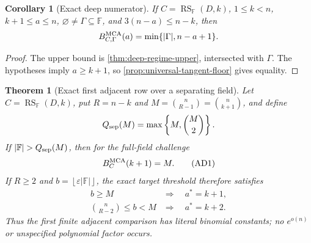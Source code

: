 \documentclass[12pt,a4paper]{amsart}
\numberwithin{equation}{section}
\newtheorem{theorem}{Theorem}[section]
\newtheorem{corollary}[corollary]{Corollary}
\theoremstyle{remark}
\DeclareMathOperator{\RS}{RS}
\newcommand{\F}{\mathbb F}
\newcommand{\eps}{\varepsilon}
\newcommand{\abs}[1]{\lvert #1\rvert}
\newcommand{\floor}[1]{\left\lfloor #1\right\rfloor}
\begin{document}
\begin{corollary}[Exact deep numerator]\label{cor:exact-deep-numerator}
If \(C=\RS_\F(D,k)\), \(1\le k<n\), \(k+1\le a\le n\),
\(\varnothing\ne\Gamma\subseteq\F\), and \(3(n-a)\le n-k\), then
\[
 B_{C,\Gamma}^{\rm MCA}(a)
 =\min\{\abs\Gamma,n-a+1\}.
\]
\end{corollary}

\begin{proof}
The upper bound is \cref{thm:deep-regime-upper}, intersected with
\(\Gamma\).  The hypotheses imply \(a\ge k+1\), so
\cref{prop:universal-tangent-floor} gives equality.
\end{proof}

\begin{theorem}[Exact first adjacent row over a separating field]
\label{thm:exact-first-adjacent-row}
Let \(C=\RS_\F(D,k)\), put \(R=n-k\) and
\(M=\binom n{R-1}=\binom n{k+1}\), and define
\[
                    Q_{\rm sep}(M)=\max\left\{M,\binom M2\right\}.
\]
If \(\abs\F>Q_{\rm sep}(M)\), then for the full-field challenge
\[
                         B_C^{\rm MCA}(k+1)=M.      \tag{AD1}
\]
If \(R\ge2\) and \(b=\floor{\eps\abs\F}\), the exact target threshold
therefore satisfies
\[
 \begin{array}{ll}
 b\ge M &\Longrightarrow\quad a^*=k+1,\\[2mm]
 \displaystyle\binom n{R-2}\le b<M
   &\Longrightarrow\quad a^*=k+2.
 \end{array}                                       \tag{AD2}
\]
Thus the first finite adjacent comparison has literal binomial constants;
no \(e^{o(n)}\) or unspecified polynomial factor occurs.
\end{theorem}
\end{document}
